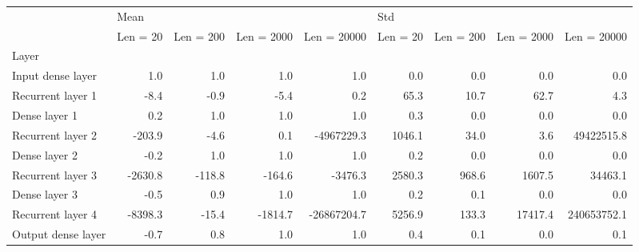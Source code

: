 \begin{tabular}{lrrrrrrrr}
\toprule
{} & \multicolumn{4}{l}{Mean} & \multicolumn{4}{l}{Std} \\
{} & Len  = 20 & Len  = 200 & Len  = 2000 & Len  = 20000 & Len  = 20 & Len  = 200 & Len  = 2000 & Len  = 20000 \\
Layer              &           &            &             &              &           &            &             &              \\
\midrule
Input dense layer  &       1.0 &        1.0 &         1.0 &          1.0 &       0.0 &        0.0 &         0.0 &          0.0 \\
Recurrent layer 1  &      -8.4 &       -0.9 &        -5.4 &          0.2 &      65.3 &       10.7 &        62.7 &          4.3 \\
Dense layer 1      &       0.2 &        1.0 &         1.0 &          1.0 &       0.3 &        0.0 &         0.0 &          0.0 \\
Recurrent layer 2  &    -203.9 &       -4.6 &         0.1 &   -4967229.3 &    1046.1 &       34.0 &         3.6 &   49422515.8 \\
Dense layer 2      &      -0.2 &        1.0 &         1.0 &          1.0 &       0.2 &        0.0 &         0.0 &          0.0 \\
Recurrent layer 3  &   -2630.8 &     -118.8 &      -164.6 &      -3476.3 &    2580.3 &      968.6 &      1607.5 &      34463.1 \\
Dense layer 3      &      -0.5 &        0.9 &         1.0 &          1.0 &       0.2 &        0.1 &         0.0 &          0.0 \\
Recurrent layer 4  &   -8398.3 &      -15.4 &     -1814.7 &  -26867204.7 &    5256.9 &      133.3 &     17417.4 &  240653752.1 \\
Output dense layer &      -0.7 &        0.8 &         1.0 &          1.0 &       0.4 &        0.1 &         0.0 &          0.1 \\
\bottomrule
\end{tabular}
